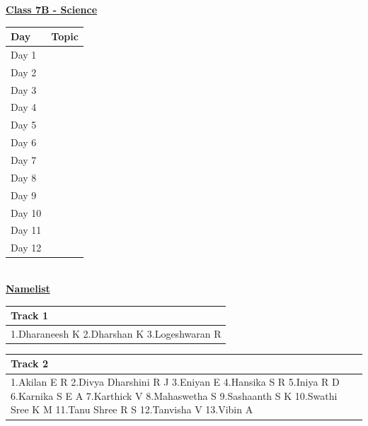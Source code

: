 \documentclass[12pt,a4paper]{article}
\newcommand{\namelisttable}[5]{
\renewcommand{\arraystretch}{#1}
\normalsize
\begin{tabular}{|>{\RaggedRight\arraybackslash} m{#2cm}|}
\hline
\rowcolor{#3} \textbf{#4} \\
\hline
#5\\
\hline
\end{tabular}
\vspace{0.2cm}
}
\newcommand{\sevenBSciPlan}{
\renewcommand{\arraystretch}{1.5}
\centering
\begin{tabular}{|>{\centering\arraybackslash}m{2cm}|>{\centering\arraybackslash}m{10cm}|}
\hline
\rowcolor{pink!50} \textbf{Day} & \textbf{Topic} \\
\hline
Day 1 & \multirow{2}{*}{Light and its properties} \\
\cline{1-1}
Day 2 & \\
\hline
Day 3 & \multirow{2}{*}{Transportation in animals} \\
\cline{1-1}
Day 4 & \\
\hline
Day 5 & \multirow{2}{*}{Motion and Time} \\
\cline{1-1}
Day 6 & \\
\hline
Day 7 & \multirow{2}{*}{Reproduction in plants} \\
\cline{1-1}
Day 8 & \\
\hline
Day 9 & \multirow{2}{*}{Forest: Our natural resource} \\
\cline{1-1}
Day 10 & \\
\hline
Day 11 & \multirow{2}{*}{Respiration in animals} \\
\cline{1-1}
Day 12 & \\
\hline
\end{tabular}
}
\newcommand{\heading}[1]{\centering \underline{\textbf{\Large  #1}} }
\begin{document}
\newpage
\heading{Class 7B  - Science}\\
\vspace{0.75cm}
\sevenBSciPlan\\
\vspace{1cm}
\heading{Namelist}
\begin{multicols}{2}
\namelisttable{1.5}{5}{pink!40}{Track 1}{1.Dharaneesh K\newline
2.Dharshan K\newline
3.Logeshwaran R}


\namelisttable{1.5}{5}{pink!40}{Track 2}{1.Akilan E R\newline
2.Divya Dharshini R J\newline
3.Eniyan E\newline
4.Hansika S R\newline
5.Iniya R D\newline
6.Karnika S E A\newline
7.Karthick V\newline
8.Mahaswetha S\newline
9.Sashaanth S K\newline
10.Swathi Sree K M\newline
11.Tanu Shree R S\newline
12.Tanvisha V\newline
13.Vibin A}


\end{multicols}
\end{document}
